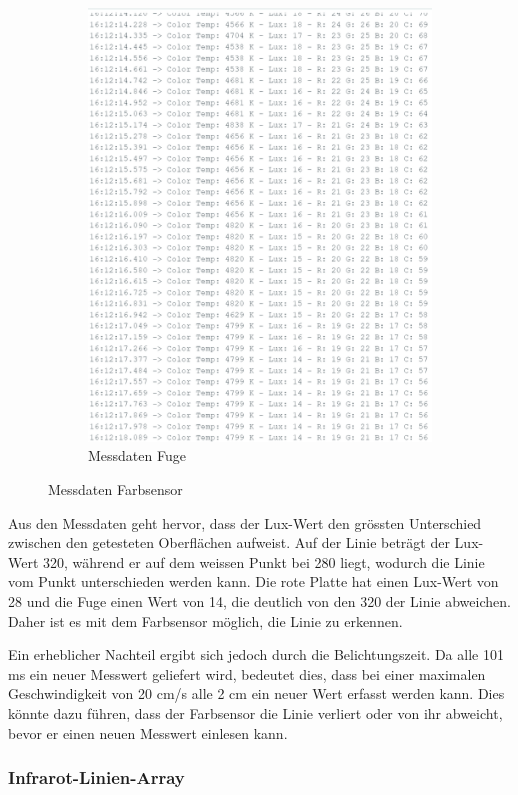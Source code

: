 \documentclass[../main.tex]{subfiles}
\begin{document}
\begin{figure}[H]
\begin{subfigure}{0.35\textwidth}
        \includegraphics[width=\linewidth]{img/sensortest/MD_Fuge_101ms.png}
        \caption{Messdaten Fuge}
        \label{fig:MDFarbsensorFuge}
    \end{subfigure}

    \caption{Messdaten Farbsensor}
    \label{fig:Testanordnungen}
\end{figure}

Aus den Messdaten geht hervor, dass der Lux-Wert den grössten Unterschied zwischen den getesteten Oberflächen aufweist. Auf der Linie beträgt der Lux-Wert 320, während er auf dem weissen Punkt bei 280 liegt, wodurch die Linie vom Punkt unterschieden werden kann. Die rote Platte hat einen Lux-Wert von 28 und die Fuge einen Wert von 14, die deutlich von den 320 der Linie abweichen. Daher ist es mit dem Farbsensor möglich, die Linie zu erkennen.

Ein erheblicher Nachteil ergibt sich jedoch durch die Belichtungszeit. Da alle 101 ms ein neuer Messwert geliefert wird, bedeutet dies, dass bei einer maximalen Geschwindigkeit von 20 cm/s alle 2 cm ein neuer Wert erfasst werden kann. Dies könnte dazu führen, dass der Farbsensor die Linie verliert oder von ihr abweicht, bevor er einen neuen Messwert einlesen kann.


\subsubsection{Infrarot-Linien-Array}
\end{document}
